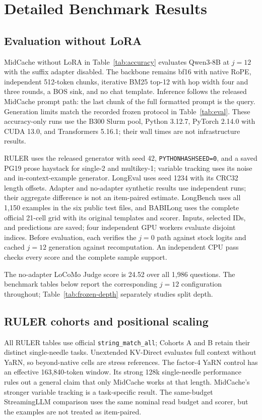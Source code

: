\FloatBarrier
\section{Detailed Benchmark Results}
\label{app:benchmarks}
\subsection{Evaluation without LoRA}
\label{app:frozen-recheck}
MidCache without LoRA in Table~\ref{tab:accuracy} evaluates Qwen3-8B at $j=12$ with the suffix adapter disabled. The backbone remains bf16 with native RoPE, independent 512-token chunks, iterative BM25 top-12 with hop width four and three rounds, a BOS sink, and no chat template. Inference follows the released MidCache prompt path: the last chunk of the full formatted prompt is the query. Generation limits match the recorded frozen protocol in Table~\ref{tab:eval}. These accuracy-only runs use the B300 Slurm pool, Python 3.12.7, PyTorch 2.14.0 with CUDA 13.0, and Transformers 5.16.1; their wall times are not infrastructure results.

RULER uses the released generator with seed 42, \texttt{PYTHONHASHSEED=0}, and a saved PG19 prose haystack for single-2 and multikey-1; variable tracking uses its noise and in-context-example generator. LongEval uses seed 1234 with its CRC32 length offsets. Adapter and no-adapter synthetic results use independent runs; their aggregate difference is not an item-paired estimate. LongBench uses all 1,150 examples in the six public test files, and BABILong uses the complete official 21-cell grid with its original templates and scorer. Inputs, selected IDs, and predictions are saved; four independent GPU workers evaluate disjoint indices. Before evaluation, each verifies the $j=0$ path against stock logits and cached $j=12$ generation against recomputation. An independent CPU pass checks every score and the complete sample support.

The no-adapter LoCoMo Judge score is 24.52 over all 1,986 questions. The benchmark tables below report the corresponding $j=12$ configuration throughout; Table~\ref{tab:frozen-depth} separately studies split depth.

\subsection{RULER cohorts and positional scaling}



All RULER tables use official \texttt{string\_match\_all}; Cohorts A and B retain their distinct single-needle tasks. Unextended KV-Direct evaluates full context without YaRN, so beyond-native cells are stress references. The factor-4 YaRN control has an effective 163,840-token window. Its strong 128k single-needle performance rules out a general claim that only MidCache works at that length. MidCache's stronger variable tracking is a task-specific result. The same-budget StreamingLLM comparison uses the same nominal read budget and scorer, but the examples are not treated as item-paired.

